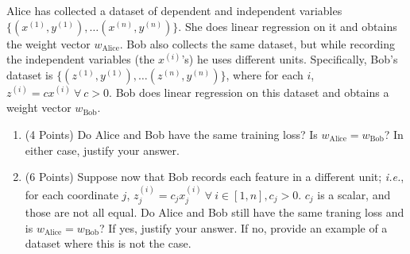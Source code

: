 \documentclass{article}
\newcounter{problem}
\begin{document}
	\begin{problem}
		Alice has collected a dataset of dependent and independent variables \(\{(x^{(1)},y^{(1)}),\hdots(x^{(n)},y^{(n)})\}\). She does linear regression on it and obtains the weight vector \(w_\text{Alice}\). Bob also collects the same dataset, but while recording the independent variables (the \(x^{(i)}\)'s) he uses different units. Specifically, Bob's dataset is \(\{(z^{(1)},y^{(1)}),\hdots(z^{(n)},y^{(n)})\}\), where for each \(i\), \(z^{(i)}=cx^{(i)}\ \forall\ c>0\). Bob does linear regression on this dataset and obtains a weight vector \(w_\text{Bob}\).
		
		\begin{enumerate}[label=(\alph*)]
			\item (4 Points) Do Alice and Bob have the same training loss? Is \(w_\text{Alice}=w_\text{Bob}\)? In either case, justify your answer.
			
			\item (6 Points) Suppose now that Bob records each feature in a different unit; \textit{i.e.}, for each coordinate \(j\), \(z_j^{(i)}=c_jx_j^{(i)}\ \forall\ i\in[1,n],c_j>0\). \(c_j\) is a scalar, and those are not all equal. Do Alice and Bob still have the same traning loss and is \(w_\text{Alice}=w_\text{Bob}\)? If yes, justify your answer. If no, provide an example of a dataset where this is not the case.
		\end{enumerate}
	\end{problem}
\end{document}
